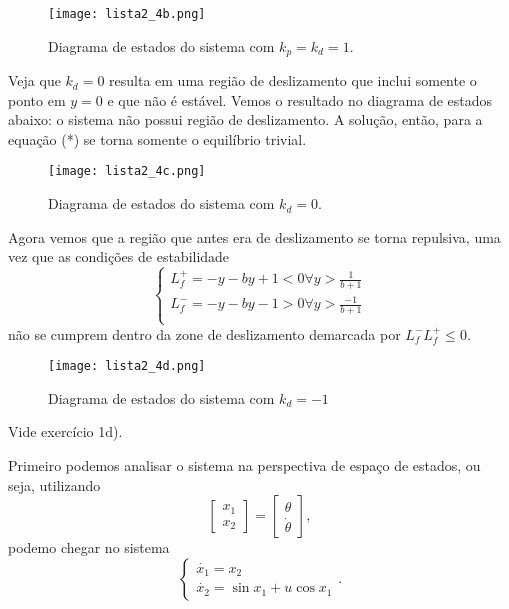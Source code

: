 \documentclass[a4paper]{report}
\begin{document}
\begin{figure}[H]
    \centering
    \texttt{[image: lista2\_4b.png]}
    \caption{Diagrama de estados do sistema com $k_p = k_d = 1$.}
    \label{fig:lista2_4b-png}
\end{figure}


Veja que $k_d=0$ resulta em uma região de deslizamento que inclui somente o ponto em $y=0$ e que não é estável. Vemos o resultado no diagrama de estados abaixo: o sistema não possui região de deslizamento. A solução, então, para a equação (*) se torna somente o equilíbrio trivial.

\begin{figure}[H]
    \centering
    \texttt{[image: lista2\_4c.png]}
    \caption{Diagrama de estados do sistema com $k_d=0$.}
    \label{fig:lista2_4c-png}
\end{figure}


Agora vemos que a região que antes era de deslizamento se torna repulsiva, uma vez que as condições de estabilidade  \[
    \begin{cases}
	L_f^{+} = -y -b y +1 < 0 \forall y > \frac{1}{b+1} \\
	L_f^{-} = - y - b y -1 > 0 \forall y > \frac{-1}{b+1} \\
    \end{cases}   
\] não se cumprem dentro da zone de deslizamento demarcada por $L_f^{-}L_f^{+} \le 0$.

\begin{figure}[H]
    \centering
    \texttt{[image: lista2\_4d.png]}
    \caption{Diagrama de estados do sistema com $k_d=-1$}
    \label{fig:lista2_4d-png}
\end{figure}


Vide exercício 1d).


Primeiro podemos analisar o sistema na perspectiva de espaço de estados, ou seja, utilizando \[
\begin{bmatrix} x_1 \\ x_2 \end{bmatrix} = \begin{bmatrix} \theta \\ \dot{\theta} \end{bmatrix} 
,\] podemo chegar no sistema \[
\begin{cases}
    \dot{x_1} = x_2 \\
    \dot{x_2} = \sin x_1 + u \cos x_1
\end{cases}
.\]  
\end{document}

